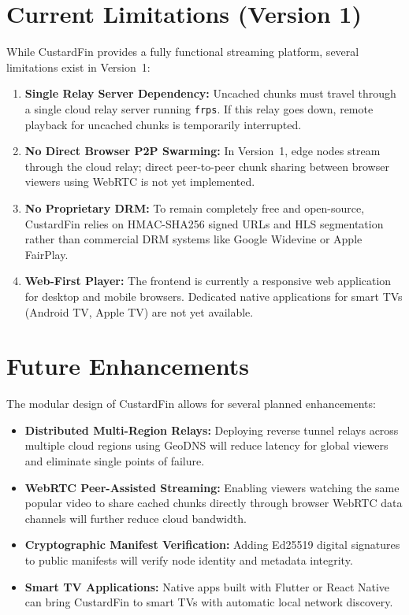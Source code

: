 \section{Current Limitations (Version 1)}
\label{sec:conclusion_limitations}

While CustardFin provides a fully functional streaming platform, several limitations exist in Version~1:
\begin{enumerate}
    \item \textbf{Single Relay Server Dependency:} Uncached chunks must travel through a single cloud relay server running \texttt{frps}. If this relay goes down, remote playback for uncached chunks is temporarily interrupted.
    \item \textbf{No Direct Browser P2P Swarming:} In Version~1, edge nodes stream through the cloud relay; direct peer-to-peer chunk sharing between browser viewers using WebRTC is not yet implemented.
    \item \textbf{No Proprietary DRM:} To remain completely free and open-source, CustardFin relies on HMAC-SHA256 signed URLs and HLS segmentation rather than commercial DRM systems like Google Widevine or Apple FairPlay.
    \item \textbf{Web-First Player:} The frontend is currently a responsive web application for desktop and mobile browsers. Dedicated native applications for smart TVs (Android TV, Apple TV) are not yet available.
\end{enumerate}

\section{Future Enhancements}
\label{sec:conclusion_future}

The modular design of CustardFin allows for several planned enhancements:
\begin{itemize}
    \item \textbf{Distributed Multi-Region Relays:} Deploying reverse tunnel relays across multiple cloud regions using GeoDNS will reduce latency for global viewers and eliminate single points of failure.
    \item \textbf{WebRTC Peer-Assisted Streaming:} Enabling viewers watching the same popular video to share cached chunks directly through browser WebRTC data channels will further reduce cloud bandwidth.
    \item \textbf{Cryptographic Manifest Verification:} Adding Ed25519 digital signatures to public manifests will verify node identity and metadata integrity.
    \item \textbf{Smart TV Applications:} Native apps built with Flutter or React Native can bring CustardFin to smart TVs with automatic local network discovery.
\end{itemize}

